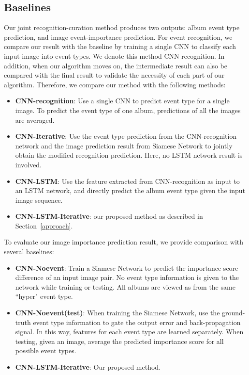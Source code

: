\documentclass[runningheads]{llncs}
\begin{document}
\subsection{Baselines}
Our joint recognition-curation method produces two outputs: album event type prediction, and image event-importance prediction. 
For event recognition, we compare our result with the baseline by training a single CNN to classify each input image into event types. We denote this method CNN-recognition. In addition, when our algorithm moves on, the intermediate result can also be compared with the final result to validate the necessity of each part of our algorithm. Therefore, we compare our method with the following methods:
\begin{itemize}
  \item \textbf{CNN-recognition}: Use a single CNN to predict event type for a single image. To predict the event type of one album, predictions of all the images are averaged.
  \item \textbf{CNN-Iterative}: Use the event type prediction from the CNN-recognition network and the image prediction result from Siamese Network to jointly obtain the modified recognition prediction. Here, no LSTM network result is involved. 
    \item \textbf{CNN-LSTM}: Use the feature extracted from CNN-recognition as input to an LSTM network, and directly predict the album event type given the input image sequence.
  \item \textbf{CNN-LSTM-Iterative}: our proposed method as described in Section~\ref{approach}.
\end{itemize}

To evaluate our image importance prediction result, we provide comparison with several baselines:
\begin{itemize}
  \item \textbf{CNN-Noevent}: Train a Siamese Network to predict the importance score difference of an input image pair. No event type information is given to the network while training or testing. All albums are viewed as from the same ``hyper" event type.
  \item \textbf{CNN-Noevent(test)}: When training the Siamese Network, use the ground-truth event type information to gate the output error and back-propagation signal. In this way, features for each event type are learned separately. When testing, given an image, average the predicted importance score for all possible event types.  
    \item \textbf{CNN-LSTM-Iterative}: Our proposed method.
    \end{itemize}
\end{document}
